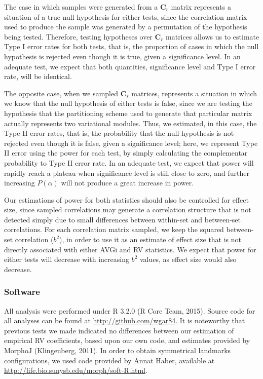 \documentclass[11pt,twoside]{report}
\begin{document}
The case in which samples were generated from a $\mathbf{C}_r$ matrix
represents a situation of a true null hypothesis for either tests, since
the correlation matrix used to produce the sample was generated by a
permutation of the hypothesis being tested. Therefore, testing
hypotheses over $\mathbf{C}_r$ matrices allows us to estimate Type I
error rates for both tests, that is, the proportion of cases in which
the null hypothesis is rejected even though it is true, given a
significance level. In an adequate test, we expect that both quantities,
significance level and Type I error rate, will be identical.

The opposite case, when we sampled $\mathbf{C}_s$ matrices, represents a
situation in which we know that the null hypothesis of either tests is
false, since we are testing the hypothesis that the partitioning scheme
used to generate that particular matrix actually represents two
variational modules. Thus, we estimated, in this case, the Type II error
rates, that is, the probability that the null hypothesis is not rejected
even though it is false, given a significance level; here, we represent
Type II error using the power for each test, by simply calculating the
complementar probability to Type II error rate. In an adequate test, we
expect that power will rapidly reach a plateau when significance level
is still close to zero, and further increasing $P(\alpha)$ will not
produce a great increase in power.

Our estimations of power for both statistics should also be controlled
for effect size, since sampled correlations may generate a correlation
structure that is not detected simply due to small differences between
within-set and between-set correlations. For each correlation matrix
sampled, we keep the squared between-set correlation ($b^2$), in order
to use it as an estimate of effect size that is not directly associated
with either AVGi and RV statistics. We expect that power for either
tests will decrease with increasing $b^2$ values, as effect size would
also decrease.

\subsubsection{Software}\label{software}

All analysis were performed under R 3.2.0 (R Core Team, 2015). Source
code for all analyses can be found at \url{http://github.com/wgar84}. It
is noteworthy that previous tests we made indicated no differences
between our estimation of empirical RV coefficients, based upon our own
code, and estimates provided by MorphoJ (Klingenberg, 2011). In order to
obtain symmetrical landmarks configurations, we used code provided by
Annat Haber, available at
\url{http://life.bio.sunysb.edu/morph/soft-R.html}.
\end{document}
